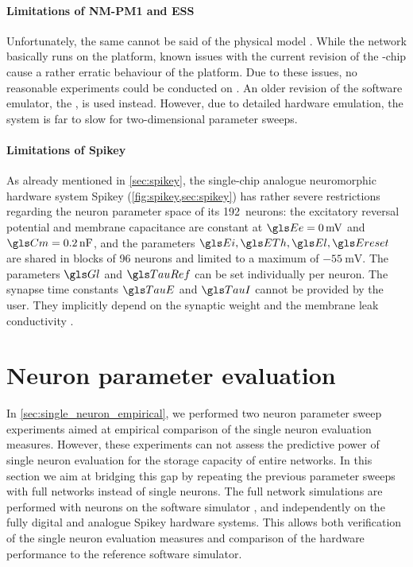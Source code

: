 \paragraph{Limitations of NM-PM1 and ESS}
Unfortunately, the same cannot be said of the physical model \NMPM. While the network basically runs on the platform, known issues with the current revision of the \mbox{\HICANN}-chip cause a rather erratic behaviour of the platform. Due to these issues, no reasonable experiments could be conducted on \NMPM. An older revision of the \NMPM software emulator, the \ESS, is used instead. However, due to detailed hardware emulation, the system is far to slow for two-dimensional parameter sweeps.

\paragraph{Limitations of Spikey}
As already mentioned in \cref{sec:spikey}, the single-chip analogue neuromorphic hardware system Spikey (\cref{fig:spikey,sec:spikey}) has rather severe restrictions regarding the neuron parameter space of its 192~\LIF neurons: the excitatory reversal potential and membrane capacitance are constant at $\Ee = \SI{0}{\milli\volt}$ and $\Cm = \SI{0.2}{\nano\farad}$, and the parameters $\Ei, \ETh, \El, \Ereset$ are shared in blocks of 96 neurons and limited to a maximum of $\SI{-55}{\milli\volt}$. The parameters $\Gl$ and $\TauRef$ can be set individually per neuron. The synapse time constants $\TauE$ and $\TauI$ cannot be provided by the user. They implicitly depend on the synaptic weight \wsyn and the membrane leak conductivity \Gl \cite{pfeil2013six}.

\section{Neuron parameter evaluation}
\label{sec:neuron_parameter_sweeps}

In \cref{sec:single_neuron_empirical}, we performed two neuron parameter sweep experiments aimed at empirical comparison of the single neuron evaluation measures. However, these experiments can not assess the predictive power of single neuron evaluation for the storage capacity \info of entire networks. In this section we aim at bridging this gap by repeating the previous parameter sweeps with full \BiNAM networks instead of single neurons. The full network simulations are performed with \LIF neurons on the software simulator \NEST, and independently on the fully digital \NMMC and analogue Spikey hardware systems. This allows both verification of the single neuron evaluation measures and comparison of the hardware performance to the reference software simulator.

